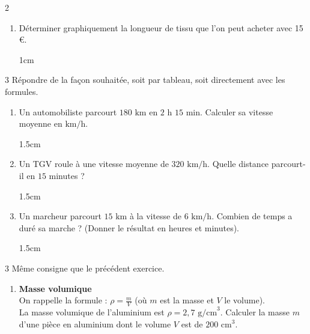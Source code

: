 \documentclass[a4paper]{book}
\begin{document}
{\begin{exerciceNote}{2}
\begin{enumerate}[leftmargin=*]
            \begin{ZoneReponse}{1cm}                
            \end{ZoneReponse}

            \item Déterminer graphiquement la longueur de tissu que l'on peut acheter avec 15 €.

            \begin{ZoneReponse}{1cm}                
            \end{ZoneReponse}
        \end{enumerate}
    \end{exerciceNote}


    \begin{exerciceNote}{3}
        Répondre de la façon souhaitée, soit par tableau, soit directement avec les formules.
        \begin{enumerate}[leftmargin=*]
            \item Un automobiliste parcourt $180 \text{ km}$ en $2 \text{ h } 15 \text{ min}$. Calculer sa vitesse moyenne en $\text{km/h}$.

            \begin{ZoneReponse}{1.5cm}                
            \end{ZoneReponse}

            \item Un TGV roule à une vitesse moyenne de $320 \text{ km/h}$. Quelle distance parcourt-il en $15$ minutes ? 

            \begin{ZoneReponse}{1.5cm}                
            \end{ZoneReponse}

            \item Un marcheur parcourt $15 \text{ km}$ à la vitesse de $6 \text{ km/h}$. Combien de temps a duré sa marche ? (Donner le résultat en heures et minutes).

            \begin{ZoneReponse}{1.5cm}                
            \end{ZoneReponse}
        \end{enumerate}       
    \end{exerciceNote}


    \begin{exerciceNote}{3}
        Même consigne que le précédent exercice.
        \begin{enumerate}[leftmargin=*]
            \item \textbf{Masse volumique} \\
            On rappelle la formule : $\rho = \frac{m}{V}$ (où $m$ est la masse et $V$ le volume). \\
            La masse volumique de l'aluminium est $\rho = 2,7 \text{ g/cm}^3$. 
            Calculer la masse $m$ d'une pièce en aluminium dont le volume $V$ est de $200 \text{ cm}^3$.


\end{enumerate}
\end{exerciceNote}}
\end{document}

